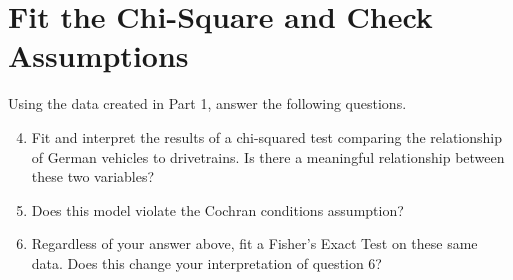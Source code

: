 \documentclass{tufte-handout}
\begin{document}
\vspace{3mm}
\section{Fit the Chi-Square and Check Assumptions} 
Using the data created in Part 1, answer the following questions. 
\begin{enumerate}
\setcounter{enumi}{3}
\item Fit and interpret the results of a chi-squared test comparing the relationship of German vehicles to drivetrains. Is there a meaningful relationship between these two variables?
\item Does this model violate the Cochran conditions assumption?
\item Regardless of your answer above, fit a Fisher's Exact Test on these same data. Does this change your interpretation of question 6?
\end{enumerate}

\end{document}
